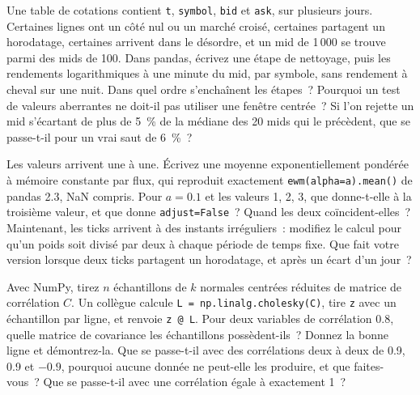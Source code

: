 \begin{question}\label{iq:iv3:python-and-pandas:31}
Une table de cotations contient \texttt{t}, \texttt{symbol}, \texttt{bid} et \texttt{ask}, sur plusieurs jours. Certaines lignes ont un côté nul ou un marché croisé, certaines partagent un horodatage, certaines arrivent dans le désordre, et un mid de 1\,000 se trouve parmi des mids de 100. Dans pandas, écrivez une étape de nettoyage, puis les rendements logarithmiques à une minute du mid, par symbole, sans rendement à cheval sur une nuit. Dans quel ordre s'enchaînent les étapes~? Pourquoi un test de valeurs aberrantes ne doit-il pas utiliser une fenêtre centrée~? Si l'on rejette un mid s'écartant de plus de 5~\% de la médiane des 20 mids qui le précèdent, que se passe-t-il pour un vrai saut de 6~\%~?
\end{question}

\begin{question}\label{iq:iv3:python-and-pandas:32}
Les valeurs arrivent une à une. Écrivez une moyenne exponentiellement pondérée à mémoire constante par flux, qui reproduit exactement \texttt{ewm(alpha=a).mean()} de pandas 2.3, NaN compris. Pour $a = 0.1$ et les valeurs 1, 2, 3, que donne-t-elle à la troisième valeur, et que donne \texttt{adjust=False}~? Quand les deux coïncident-elles~? Maintenant, les ticks arrivent à des instants irréguliers~: modifiez le calcul pour qu'un poids soit divisé par deux à chaque période de temps fixe. Que fait votre version lorsque deux ticks partagent un horodatage, et après un écart d'un jour~?
\end{question}

\begin{question}\label{iq:iv3:python-and-pandas:33}
Avec NumPy, tirez $n$ échantillons de $k$ normales centrées réduites de matrice de corrélation $C$. Un collègue calcule \texttt{L = np.linalg.cholesky(C)}, tire \texttt{z} avec un échantillon par ligne, et renvoie \texttt{z @ L}. Pour deux variables de corrélation 0.8, quelle matrice de covariance les échantillons possèdent-ils~? Donnez la bonne ligne et démontrez-la. Que se passe-t-il avec des corrélations deux à deux de 0.9, 0.9 et $-0.9$, pourquoi aucune donnée ne peut-elle les produire, et que faites-vous~? Que se passe-t-il avec une corrélation égale à exactement 1~?
\end{question}

